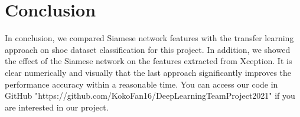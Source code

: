 \section{Conclusion}

In conclusion, we compared Siamese network features with the transfer learning approach on shoe dataset classification for this project. In addition, we showed the effect of the Siamese network on the features extracted from Xception. It is clear numerically and visually that the last approach significantly improves the performance accuracy within a reasonable time. You can access our code in GitHub "https://github.com/KokoFan16/DeepLearningTeamProject2021" if you are interested in our project. 